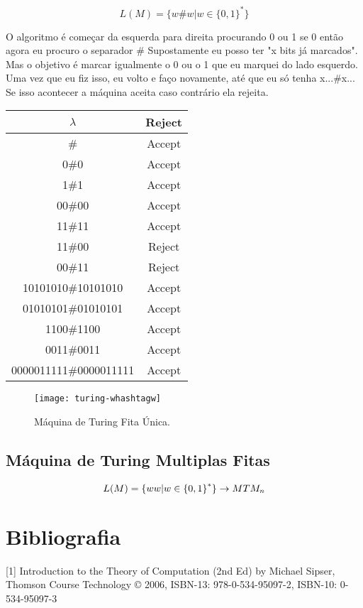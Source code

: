\documentclass[12pt, a4paper]{article}
\begin{document}
$$ L(M)= \lbrace w \# w \vert w \in  {\lbrace 0,1 \rbrace}^* \rbrace $$

\qquad O algoritmo é começar da esquerda para direita procurando 0 ou 1 se 0 então agora eu procuro o separador \# Supostamente eu posso ter "x bits já marcados". Mas o objetivo é marcar igualmente o 0 ou o 1 que eu marquei do lado esquerdo. Uma vez que eu fiz isso, eu volto e faço novamente, até que eu só tenha x...\#x... Se isso acontecer a máquina aceita caso contrário ela rejeita.


\begin{tabular}{|c|c|}
  \hline $\lambda$              & Reject \\
  \hline \#                     & Accept \\
  \hline 0\#0                   & Accept \\
  \hline 1\#1                   & Accept \\
  \hline 00\#00                 & Accept \\
  \hline 11\#11                 & Accept \\
  \hline 11\#00                 & Reject \\
  \hline 00\#11                 & Reject \\
  \hline 10101010\#10101010     & Accept \\
  \hline 01010101\#01010101     & Accept \\
  \hline 1100\#1100             & Accept \\
  \hline 0011\#0011             & Accept \\
  \hline 0000011111\#0000011111 & Accept \\
  \hline
\end{tabular}

\begin{figure}[ht]
\centering
\texttt{[image: turing-whashtagw]}
\caption{Máquina de Turing Fita Única.}
\end{figure}

\pagebreak
\subsection{Máquina de Turing Multiplas Fitas}

$$ L(M)= \lbrace ww \vert w \in  {\lbrace 0,1 \rbrace}^* \rbrace \rightarrow MT \small M_{n} $$

\pagebreak
\section{Bibliografia}

[1] Introduction to the Theory of Computation (2nd Ed) by Michael Sipser, Thomson Course Technology © 2006, ISBN-13: 978-0-534-95097-2, ISBN-10: 0-534-95097-3
\end{document}
